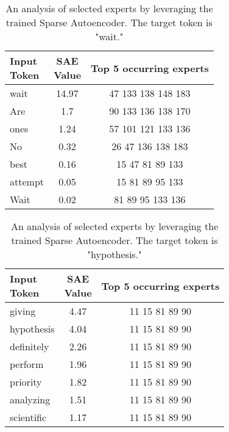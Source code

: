 \begin{table}[]
    \centering
    \begin{tabular}{lcc}
        \makecell{Input \\ Token} & \makecell{SAE \\ Value}  & Top 5 occurring experts \\
        \toprule
         wait & 14.97 & 47 \hfill 133 \hfill 138 \hfill 148 \hfill 183 \\
         Are & 1.7 & 90 \hfill 133 \hfill 136 \hfill 138 \hfill 170 \\
         ones & 1.24 & 57 \hfill 101 \hfill 121 \hfill 133 \hfill 136 \\
         No & 0.32 & 26 \hfill 47 \hfill 136 \hfill 138 \hfill 183 \\
         best & 0.16 & 15 \hfill 47 \hfill 81 \hfill 89 \hfill 133 \\
         attempt & 0.05 & 15 \hfill 81 \hfill 89 \hfill 95 \hfill 133 \\
         Wait & 0.02 & 81 \hfill 89 \hfill 95 \hfill 133 \hfill 136 \\
        \bottomrule
    \end{tabular}
    \caption{An analysis of selected experts by leveraging the trained Sparse Autoencoder. The target token is "wait."}
    \label{tab:sae_wait}
\end{table}

\begin{table}[]
    \centering
    \begin{tabular}{lcc}
        \makecell{Input \\ Token} & \makecell{SAE \\ Value}  & Top 5 occurring experts \\
        \toprule
         giving & 4.47 & 11 \hfill 15 \hfill 81 \hfill 89 \hfill 90 \\
         hypothesis & 4.04 & 11 \hfill 15 \hfill 81 \hfill 89 \hfill 90 \\
         definitely & 2.26 & 11 \hfill 15 \hfill 81 \hfill 89 \hfill 90 \\
         perform & 1.96 & 11 \hfill 15 \hfill 81 \hfill 89 \hfill 90 \\
         priority & 1.82 & 11 \hfill 15 \hfill 81 \hfill 89 \hfill 90 \\
         analyzing & 1.51 & 11 \hfill 15 \hfill 81 \hfill 89 \hfill 90 \\
         scientific & 1.17 & 11 \hfill 15 \hfill 81 \hfill 89 \hfill 90 \\
        \bottomrule
    \end{tabular}
    \caption{An analysis of selected experts by leveraging the trained Sparse Autoencoder. The target token is "hypothesis."}
    \label{tab:sae_hypothesis}
\end{table}


